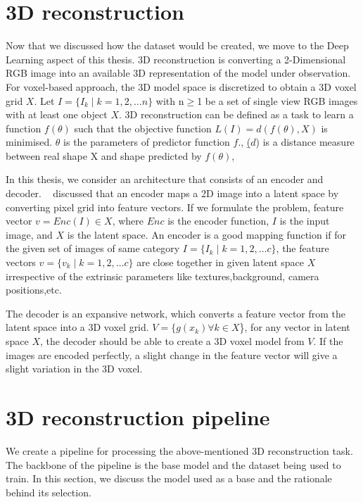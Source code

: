 \section{3D reconstruction}\label{sec:3D reconstruction}
Now that we discussed how the dataset would be created, we move to the Deep Learning aspect of this thesis.
3D reconstruction is converting a 2-Dimensional RGB image into an available 3D representation of the model under observation.
For voxel-based approach, the 3D model space is discretized to obtain a 3D voxel grid $X$.
Let $I = \{I_k \mid k = 1,2,\dots n\}$ with n$\geq$1 be a set of single view RGB images with at least one object $X$.
3D reconstruction can be defined as a task to learn a function $f(\theta)$ such that the objective function $L(I) = d(f(\theta),X)$ is minimised.
$\theta$ is the parameters of predictor function $f$., \b($d$) is a distance measure between real shape X and shape predicted by $f(\theta)$,

In this thesis, we consider an architecture that consists of an encoder and decoder.
~\cite{Han2021ImageBased3O} discussed that an encoder maps a 2D image into a latent space by converting pixel grid into feature vectors.
If we formulate the problem, feature vector $v= Enc(I) \in X$, where $Enc$ is the encoder function, $I$ is the input image, and $X$ is the latent space.
An encoder is a good mapping function if for the given set of images of same category $I = \{I_k \mid k = 1,2,\dots c\}$, the feature vectors $v = \{v_k \mid k = 1,2,\dots c\}$ are close together in given latent space $X$
irrespective of the extrinsic parameters like textures,background, camera positions,etc.

The decoder is an expansive network, which converts a feature vector from the latent space into a 3D voxel grid.
$V = \{g(x_k) \forall k \in X$\}, for any vector in latent space $X$, the decoder should be able to create a 3D voxel model from $V$.
If the images are encoded perfectly, a slight change in the feature vector will give a slight variation in the 3D voxel.

\section{3D reconstruction pipeline}\label{sec:3D reconstruction pipeline}
We create a pipeline for processing the above-mentioned 3D reconstruction task.
The backbone of the pipeline is the base model and the dataset being used to train.
In this section, we discuss the model used as a base and the rationale behind its selection.

